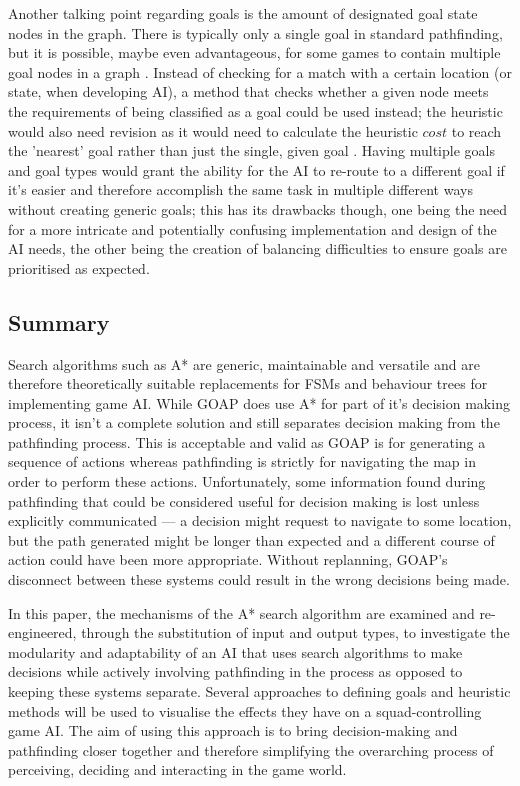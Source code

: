 \documentclass[11pt, a4paper]{report}
\begin{document}
Another talking point regarding goals is the amount of designated goal state nodes in the graph. There is typically only a single goal in standard pathfinding, but it is possible, maybe even advantageous, for some games to contain multiple goal nodes in a graph \parencite[272]{millington2019ai}. Instead of checking for a match with a certain location (or state, when developing AI), a method that checks whether a given node meets the requirements of being classified as a goal could be used instead; the heuristic would also need revision as it would need to calculate the heuristic $cost$ to reach the 'nearest' goal rather than just the single, given goal \parencite[272]{millington2019ai}. Having multiple goals and goal types \parencite[121]{higgins2002generic} would grant the ability for the AI to re-route to a different goal if it's easier and therefore accomplish the same task in multiple different ways without creating generic goals; this has its drawbacks though, one being the need for a more intricate and potentially confusing implementation and design of the AI needs, the other being the creation of balancing difficulties to ensure goals are prioritised as expected.

\subsection{Summary}
\label{subsec:litReviewSummary}

Search algorithms such as A* are generic, maintainable and versatile and are therefore theoretically suitable replacements for FSMs and behaviour trees for implementing game AI. While GOAP does use A* for part of it's decision making process, it isn't a complete solution and still separates decision making from the pathfinding process. This is acceptable and valid as GOAP is for generating a sequence of actions whereas pathfinding is strictly for navigating the map in order to perform these actions. Unfortunately, some information found during pathfinding that could be considered useful for decision making is lost unless explicitly communicated --- a decision might request to navigate to some location, but the path generated might be longer than expected and a different course of action could have been more appropriate. Without replanning, GOAP's disconnect between these systems could result in the wrong decisions being made.

In this paper, the mechanisms of the A* search algorithm are examined and re-engineered, through the substitution of input and output types, to investigate the modularity and adaptability of an AI that uses search algorithms to make decisions while actively involving pathfinding in the process as opposed to keeping these systems separate. Several approaches to defining goals and heuristic methods will be used to visualise the effects they have on a squad-controlling game AI. The aim of using this approach is to bring decision-making and pathfinding closer together and therefore simplifying the overarching process of perceiving, deciding and interacting in the game world.
\end{document}
